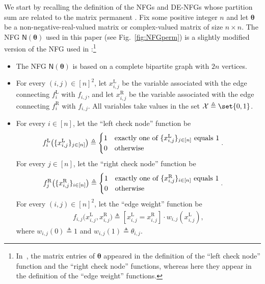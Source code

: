 \documentclass[conference]{IEEEtran}
\theoremstyle{plain}
\theoremstyle{definition}
\newcommand{\sfn}{\mathsf{N}}
\newcommand{\fr}[1]{ f^{\mathrm{R}}_{ #1 } }
\newcommand{\fl}[1]{ f^{\mathrm{L}}_{ #1 } }
\newcommand{\fe}[1]{ f_{ #1 }}
\newcommand{\xr}[1]{ x^{\mathrm{R}}_{ #1 } }
\newcommand{\xl}[1]{ x^{\mathrm{L}}_{ #1 } }
\newcommand{\btheta}{\boldsymbol{\theta}}
\newcommand{\defeq}{\triangleq}
\begin{document}
We start by recalling the definition of the NFGs and DE-NFGs whose partition
sum are related to the matrix permanent
\cite{vontobelBethePermanentNonnegative2013,caoDoubleedgeFactorGraphs2017}. Fix
some positive integer $n$ and let $\btheta$ be a non-negative-real-valued
matrix or complex-valued matrix of size $n\times n$. The NFG $\sfn(\btheta)$
used in this paper (see Fig.~\ref{fig:NFGperm}) is a slightly modified version
of the NFG used in
\cite{vontobelBethePermanentNonnegative2013}:\footnote{In~\cite{vontobelBethePermanentNonnegative2013},
the matrix entries of $\btheta$ appeared in the definition of the ``left check
node'' function and the ``right check node'' functions, whereas here they
appear in the definition of the ``edge weight'' functions.}
\begin{itemize}

 \item The NFG $\sfn({\btheta})$ is based on a complete bipartite graph with
 $2n$ vertices.

 \item For every $(i,j) \in [n]^2$, let $\xl{i,j}$ be the variable associated
 with the edge connecting $\fl{i}$ with $\fe{i,j}$, and let $\xr{i,j}$ be the
 variable associated with the edge connecting $\fr{i}$ with $\fe{i,j}$. All
 variables take values in the set $\mathcal {X} \defeq \set{0,1}$.

 \item For every $i \in [n]$, let the ``left check node'' function be
 \begin{align*}
  \hspace{-1.5em}
  \fl{i}\bigl(\{\xl{i,j}\}_{j\in[n]}\bigr) \defeq
  \begin{cases}
  1 & \text{exactly one of } \{\xl{i,j}\}_{j\in[n]} \text{ equals } 1 \\
  0 & \text{otherwise}\end{cases}.
 \end{align*}
 For every $j \in [n]$, let the ``right check node'' function be
 \begin{align*}
  \hspace{-1.5em}
  \fr{j}\bigl(\{\xr{i,j}\}_{i\in[n]}\bigr) \defeq
  \begin{cases}
  1 & \text{exactly one of } \{\xr{i,j}\}_{i\in[n]} \text{ equals } 1 \\
  0 & \text{otherwise}\end{cases}.
 \end{align*}
 For every $(i,j) \in [n]^2$, let the ``edge weight'' function be
 \begin{align*}
  \fe{i,j}\bigl(\xl{i,j},\xr{i,j}\bigr)\defeq \left[\xl{i,j}=\xr{i,j}\right] \cdot w_{i,j} (\xl{i,j}),
 \end{align*}
 where $w_{i,j}(0) \defeq 1$ and $w_{i,j}(1) \defeq \theta_{i,j}$.


\end{itemize}
\end{document}
